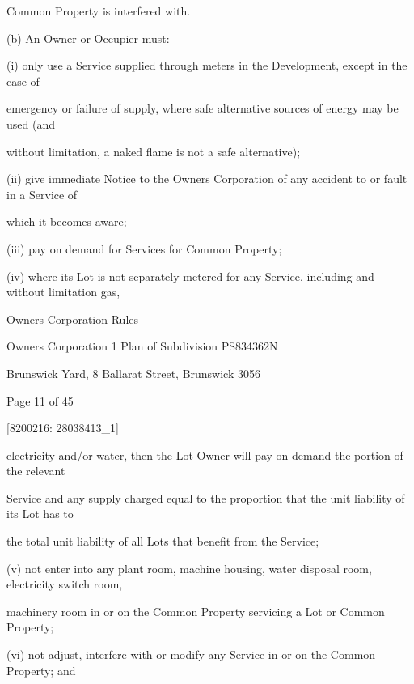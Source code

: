 \documentclass{article}
\begin{document}
{\fontsize{10.02}{1}Common Property is interfered with. }

{\fontsize{9.962}{1}(b) An Owner or Occupier must: }

{\fontsize{9.962}{1}(i) only use a Service supplied through meters in the Development, except in the case of }

{\fontsize{10.02}{1}emergency or failure of supply, where safe alternative sources of energy may be used (and }

{\fontsize{10.02}{1}without limitation, a naked flame is not a safe alternative); }

{\fontsize{9.962}{1}(ii) give immediate Notice to the Owners Corporation of any accident to or fault in a Service of }

{\fontsize{10.02}{1}which it becomes aware; }

{\fontsize{9.962}{1}(iii) pay on demand for Services for Common Property; }

{\fontsize{9.962}{1}(iv) where its Lot is not separately metered for any Service, including and without limitation gas, }

\newpage





{\fontsize{9}{1}Owners Corporation Rules }

{\fontsize{9}{1}Owners Corporation 1 Plan of Subdivision PS834362N }

{\fontsize{9}{1}Brunswick Yard, 8 Ballarat Street, Brunswick 3056 }


{\fontsize{9}{1}Page 11  of 45 }



{\fontsize{7.02}{1}[8200216: 28038413\_1] }

{\fontsize{10.02}{1}electricity and/or water, then the Lot Owner will pay on demand the portion of the relevant }

{\fontsize{10.02}{1}Service and any supply charged equal to the proportion that the unit liability of its Lot has to }

{\fontsize{10.02}{1}the total unit liability of all Lots that benefit from the Service; }

{\fontsize{9.962}{1}(v) not enter into any plant room, machine housing, water disposal room, electricity switch room, }

{\fontsize{10.02}{1}machinery room in or on the Common Property servicing a Lot or Common Property; }

{\fontsize{9.962}{1}(vi) not adjust, interfere with or modify any Service in or on the Common Property; and }
\end{document}
